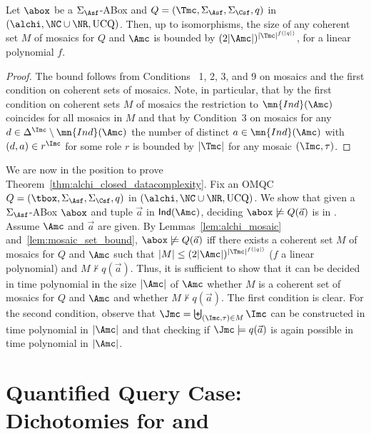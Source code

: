 \documentclass{lmcs}
\theoremstyle{definition}
\begin{document}
\begin{lem}\label{lem:mosaic_set_bound}
  Let $\abox$ be a $\Sigma_{\Asf}$-ABox and
  $Q=(\Tmc,\Sigma_\Asf,\Sigma_\Csf,q)$ in $(\alchi,\NC \cup
  \NR,\text{UCQ})$. Then, up to isomorphisms, the size of any
  coherent set $M$ of mosaics for $Q$ and $\Amc$ is bounded by $(2|\Amc|)^{|\Tmc|^{f(|q|)}}$, for
  a linear polynomial $f$.
\end{lem}
\begin{proof}
  The bound follows from Conditions~ 1, 2, 3, and 9 on mosaics and the
  first condition on coherent sets of mosaics. Note, in particular,
  that by the first condition on coherent sets $M$ of mosaics the
  restriction to $\mn{Ind}(\Amc)$ coincides for all mosaics in $M$ and
  that by Condition~3 on mosaics for any $d\in \Delta^{\Imc}\setminus
  \mn{Ind}(\Amc)$ the number of distinct $a\in \mn{Ind}(\Amc)$ with
  $(d,a)\in r^{\Imc}$ for some role $r$ is bounded by $|\Tmc|$ for any
  mosaic $(\Imc,\tau)$.
\end{proof}
We are now in the position to prove
Theorem~\ref{thm:alchi_closed_datacomplexity}.  Fix an OMQC
$Q=(\tbox,\Sigma_\Asf,\Sigma_\Csf,q)$ in
$(\alchi,\NC \cup \NR,\text{UCQ})$.  We show that given a
$\Sigma_{\Asf}$-ABox $\abox$ and tuple $\vec{a}$ in ${\sf Ind}(\Amc)$,
deciding $\abox\not\models Q(\vec{a})$ is in \np.  Assume $\Amc$ and
$\vec{a}$ are given. By Lemmas~\ref{lem:alchi_mosaic}
and~\ref{lem:mosaic_set_bound}, $\abox\not\models Q(\vec{a})$ iff
there exists a coherent set $M$ of mosaics for $Q$ and $\Amc$ such
that $|M| \leq (2|\Amc|)^{|\Tmc|^{f(|q|)}}$ ($f$ a linear polynomial)
and $M\not\vdash q(\vec{a})$. Thus, it is sufficient to show that it
can be decided in time polynomial in the size $|\Amc|$ of $\Amc$
whether $M$ is a coherent set of mosaics for $Q$ and $\Amc$ and
whether $M\not\vdash q(\vec{a})$. The first condition is clear. For
the second condition, observe that
$\Jmc = \biguplus_{(\Imc,\tau)\in M}\Imc$ can be constructed in
time polynomial in $|\Amc|$ and that checking if
$\Jmc\models q(\vec{a})$ is again possible in time polynomial in $|\Amc|$.

\section{Quantified Query Case: Dichotomies for \dlliter and \el}
\label{sec:dichotomytbox}
\end{document}
